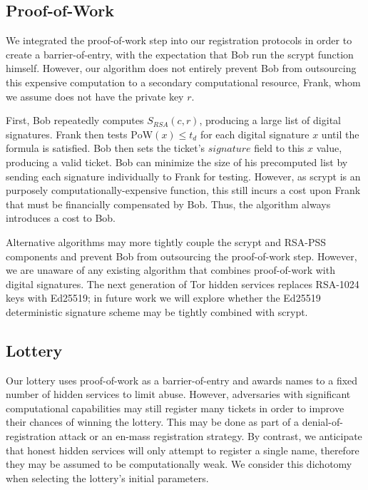 \documentclass[USenglish,oneside,twocolumn]{article}
\begin{document}
\subsection{Proof-of-Work}
\label{sec:proofOfWork}


We integrated the proof-of-work step into our registration protocols in order to create a barrier-of-entry, with the expectation that Bob run the scrypt function himself. However, our algorithm does not entirely prevent Bob from outsourcing this expensive computation to a secondary computational resource, Frank, whom we assume does not have the private key $ r $. 

First, Bob repeatedly computes $ S_{\mathit{RSA}}(c, r) $, producing a large list of digital signatures. Frank then tests $ \mathrm{PoW}(x) \leq t_{d} $ for each digital signature $ x $ until the formula is satisfied. Bob then sets the ticket's $ \mathit{signature} $ field to this $ x $ value, producing a valid ticket. Bob can minimize the size of his precomputed list by sending each signature individually to Frank for testing. However, as scrypt is an purposely computationally-expensive function, this still incurs a cost upon Frank that must be financially compensated by Bob. Thus, the algorithm always introduces a cost to Bob.

Alternative algorithms may more tightly couple the scrypt and RSA-PSS components and prevent Bob from outsourcing the proof-of-work step. However, we are unaware of any existing algorithm that combines proof-of-work with digital signatures. The next generation of Tor hidden services \cite{TorProp224} replaces RSA-1024 keys with Ed25519; in future work we will explore whether the Ed25519 deterministic signature scheme may be tightly combined with scrypt. 

\subsection{Lottery}
\label{sec:lottery}

Our lottery uses proof-of-work as a barrier-of-entry and awards names to a fixed number of hidden services to limit abuse. However, adversaries with significant computational capabilities may still register many tickets in order to improve their chances of winning the lottery. This may be done as part of a denial-of-registration attack or an en-mass registration strategy. By contrast, we anticipate that honest hidden services will only attempt to register a single name, therefore they may be assumed to be computationally weak. We consider this dichotomy when selecting the lottery's initial parameters.
\end{document}
